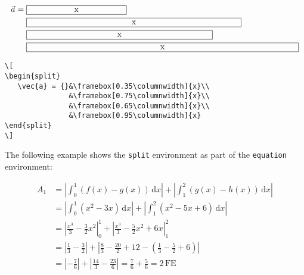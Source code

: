 \begin{table}[htb]
\hspace*{-\marginparwidth}%
\begin{minipage}{0.5\columnwidth}
\[
\begin{split}
   \vec{a} = {}&\framebox[0.35\columnwidth]{x}\\
             &\framebox[0.75\columnwidth]{x}\\
             &\framebox[0.65\columnwidth]{x}\\
             &\framebox[0.95\columnwidth]{x}
\end{split}
\]
\end{minipage}\hspace{1cm}%
\begin{minipage}{0.5\columnwidth}
\footnotesize%
\begin{verbatim}
\[
\begin{split}
   \vec{a} = {}&\framebox[0.35\columnwidth]{x}\\
               &\framebox[0.75\columnwidth]{x}\\
               &\framebox[0.65\columnwidth]{x}\\
               &\framebox[0.95\columnwidth]{x}
\end{split}
\]
\end{verbatim}
\end{minipage}
\vspace{1ex}

The following example shows the \texttt{split} environment as part
of the \texttt{equation} environment:

\begin{equation}
\begin{split}A_{1} & =\left|\int_{0}^{1}(f(x)-g(x))\,\mathrm{d}x\right|+\left|\int_{1}^{2}(g(x)-h(x))\,\mathrm{d}x\right|\\
 & =\left|\int_{0}^{1}(x^{2}-3x)\,\mathrm{d}x\right|+\left|\int_{1}^{2}(x^{2}-5x+6)\,\mathrm{d}x\right|\\
 & =\left|\frac{x^{3}}{3}-\frac{3}{2}x^{2}\right|_{0}^{1}+\left|\frac{x^{3}}{3}-\frac{5}{2}x^{2}+6x\right|_{1}^{2}\\
 & =\left|\frac{1}{3}-\frac{3}{2}\right|+\left|\frac{8}{3}-\frac{20}{2}+12-\left(\frac{1}{3}-\frac{5}{2}+6\right)\right|\\
 & =\left|-\frac{7}{6}\right|+\left|\frac{14}{3}-\frac{23}{6}\right|=\frac{7}{6}+\frac{5}{6}=2\,\textrm{FE}\end{split}
\label{eq:Beispiel-Integral}\end{equation}



\end{table}
